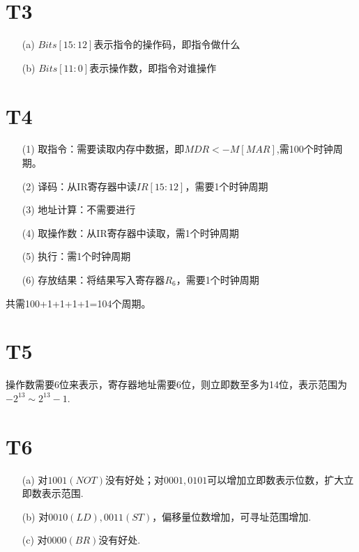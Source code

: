 \documentclass{article}
\begin{document}
\section*{T3}
\begin{enumerate}
    \item [(a)]$Bits[15:12]$表示指令的操作码，即指令做什么
    \item [(b)]$Bits[11:0]$表示操作数，即指令对谁操作
\end{enumerate}
\section*{T4}
    \begin{enumerate}
        \item [(1)] 取指令：需要读取内存中数据，即$MDR <- M[MAR]$,需100个时钟周期。
        
        \item [(2)] 译码：从IR寄存器中读$IR[15:12]$，需要1个时钟周期
            
        \item [(3)] 地址计算：不需要进行
    
        \item [(4)] 取操作数：从IR寄存器中读取，需1个时钟周期
        
        \item [(5)] 执行：需1个时钟周期
        
        \item [(6)] 存放结果：将结果写入寄存器$R_6$，需要1个时钟周期
    \end{enumerate}
    共需100+1+1+1+1=104个周期。
\section*{T5}
    操作数需要6位来表示，寄存器地址需要6位，则立即数至多为14位，表示范围为$-2^{13} \sim 2^{13}-1$.
\section*{T6}
    \begin{enumerate}
        \item [(a)]对$1001 (NOT)$没有好处；对$0001,0101$可以增加立即数表示位数，扩大立即数表示范围.
        \item [(b)]对$0010 (LD),0011 (ST)$，偏移量位数增加，可寻址范围增加.
        \item [(c)]对$0000 (BR)$没有好处.
    \end{enumerate}
\end{document}
